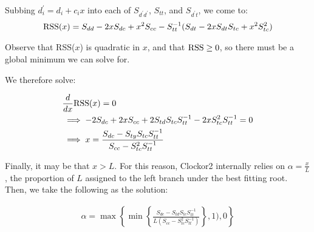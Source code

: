 \documentclass{article}
\begin{document}
Subbing $d^{\prime}_i = d_{i} + c_{i}x$ into each of $S_{d^{\prime}d^{\prime}}$, $S_{tt}$, and $S_{d^{\prime}t}$, we come to:
\begin{equation}
\begin{aligned}
    \textnormal{RSS}(x) = S_{dd} - 2xS_{dc} + x^{2}S_{cc} - S_{tt}^{-1}(S_{dt} - 2xS_{dt}S_{tc} + x^{2}S_{tc}^{2})
\end{aligned}
\end{equation}


Observe that RSS($x$) is quadratic in $x$, and that $ \textnormal{RSS} \ge 0$, so there must be a global minimum we can solve for.

We therefore solve:

\begin{equation}
\begin{aligned}
    &\frac{d}{dx}\textnormal{RSS}(x) = 0 \\
    &\implies  -2S_{dc} + 2xS_{cc} + 2S_{td}S_{tc}S_{tt}^{-1} - 2xS_{tc}^{2}S_{tt}^{-1} = 0 \\
    &\implies x = \frac{S_{dc}-S_{ty}S_{tc}S_{tt}^{-1}}{S_{cc}-S_{tc}^2S_{tt}^{-1}}
\end{aligned}
\end{equation}

Finally, it may be that $x > L$. For this reason, Clockor2 internally relies on $\alpha = \frac{x}{L}$, the proportion of $L$ assigned to the left branch under the best fitting root. Then, we take the following as the solution:

\begin{equation}
\begin{aligned}
    \alpha = \max \left \{ \min \left \{ \frac{S_{dc}-S_{td}S_{tc}S_{tt}^{-1}}{L(S_{cc}-S_{tc}^2S_{tt}^{-1})} \right \}, 1), 0  \right \} 
\end{aligned}
\end{equation}
\end{document}
